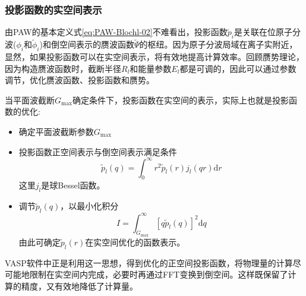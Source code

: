 \subsubsection{投影函数的实空间表示}
由\textrm{PAW}的基本定义式\eqref{eq:PAW-Blochl-02}不难看出，投影函数$\tilde p_i$是关联在位原子分波($\phi_i$和$\tilde\phi_i$)和倒空间表示的赝波函数$\tilde\Psi$的枢纽。因为原子分波局域在离子实附近，显然，如果投影函数可以在实空间表示，将有效地提高计算效率。回顾赝势理论，因为构造赝波函数时，截断半径$R_l$和能量参数$E_l$都是可调的，因此可以通过参数调节，优化赝波函数、投影函数和赝势。

当平面波截断$G_{\mathrm{max}}$确定条件下，投影函数在实空间的表示，实际上也就是投影函数的优化:~
\begin{itemize}
	\item 确定平面波截断参数$G_{\mathrm{max}}$
	\item 投影函数正空间表示与倒空间表示满足条件
		\begin{equation}
			\tilde p_l(q)=\int_0^{\infty}r^2\tilde p_l(r)j_l(qr)\mathrm{d}r
			\label{eq:projector_G_R}
		\end{equation}
		这里$j_l$是球\textrm{Bessel}函数。
	\item 调节$\tilde p_l(q)$，以最小化积分
		\begin{equation}
			I=\int_{G_{\mathrm{max}}}^{\infty}[q\tilde p_l(q)]^2\mathrm{d}q
			\label{eq:projector_Int}
		\end{equation}
		由此可确定$\tilde p_l(r)$在实空间优化的函数表示。
\end{itemize}
\textrm{VASP}软件中正是利用这一思想，得到优化的正空间投影函数，将物理量的计算尽可能地限制在实空间内完成，必要时再通过\textrm{FFT}变换到倒空间。这样既保留了计算的精度，又有效地降低了计算量。

